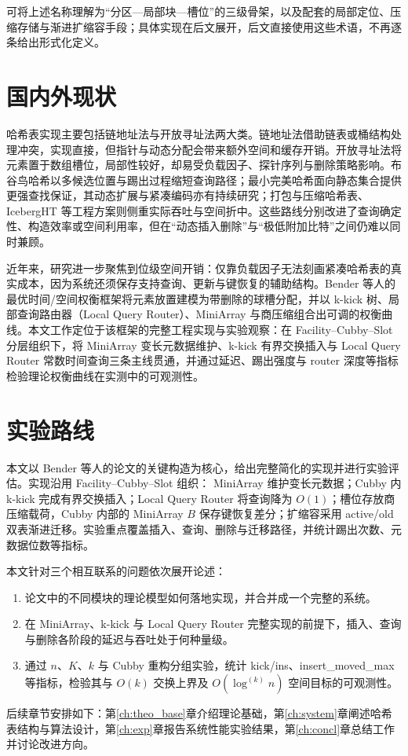 可将上述名称理解为“分区—局部块—槽位”的三级骨架，以及配套的局部定位、压缩存储与渐进扩缩容手段；具体实现在后文展开，后文直接使用这些术语，不再逐条给出形式化定义。

\section{国内外现状}

哈希表实现主要包括链地址法与开放寻址法两大类\cite{knuth1973sorting,bender2024sosa}。链地址法借助链表或桶结构处理冲突，实现直接，但指针与动态分配会带来额外空间和缓存开销。开放寻址法将元素置于数组槽位，局部性较好，却易受负载因子、探针序列与删除策略影响。布谷鸟哈希\cite{pagh2004cuckoo,lehmann2023sichash}以多候选位置与踢出过程缩短查询路径；最小完美哈希\cite{lehmann2026mphsurvey,lehmann2024shockhash,hermann2024phobic}面向静态集合提供更强查找保证，其动态扩展与紧凑编码亦有持续研究\cite{kuszmaul2024filters,lehmann2025combined}；打包与压缩哈希表\cite{kurpicz2023pachash}、IcebergHT\cite{pandey2023iceberght,bender2024iceberg} 等工程方案则侧重实际吞吐与空间折中。这些路线分别改进了查询确定性、构造效率或空间利用率，但在“动态插入删除”与“极低附加比特”之间仍难以同时兼顾。

近年来，研究进一步聚焦到位级空间开销：仅靠负载因子无法刻画紧凑哈希表的真实成本，因为系统还须保存支持查询、更新与键恢复的辅助结构。Bender 等人的最优时间/空间权衡框架\cite{bender2022otsh}将元素放置建模为带删除的球槽分配\cite{aamand2021dynamic,bansal2022deletions}，并以 k-kick 树、局部查询路由器（Local Query Router）、MiniArray 与商压缩组合出可调的权衡曲线。本文工作定位于该框架的完整工程实现与实验观察：在 Facility--Cubby--Slot 分层组织下，将 MiniArray 变长元数据维护、k-kick 有界交换插入与 Local Query Router 常数时间查询三条主线贯通，并通过延迟、踢出强度与 router 深度等指标检验理论权衡曲线在实测中的可观测性\cite{bender2022otsh,kuszmaul2024filters}。

\section{实验路线}

本文以 Bender 等人的论文\cite{bender2022otsh}的关键构造为核心，给出完整简化的实现并进行实验评估。实现沿用 Facility--Cubby--Slot 组织： MiniArray 维护变长元数据；Cubby 内 k-kick 完成有界交换插入；Local Query Router 将查询降为 \(O(1)\)；槽位存放商压缩载荷，Cubby 内部的 MiniArray \(B\) 保存键恢复差分；扩缩容采用 active/old 双表渐进迁移。实验重点覆盖插入、查询、删除与迁移路径，并统计踢出次数、元数据位数等指标。

本文针对三个相互联系的问题依次展开论述：
\begin{enumerate}
  \item 论文中的不同模块的理论模型如何落地实现，并合并成一个完整的系统。
  \item 在 MiniArray、k-kick 与 Local Query Router 完整实现的前提下，插入、查询与删除各阶段的延迟与吞吐处于何种量级。
  \item 通过 \(n\)、\(K\)、\(k\) 与 Cubby 重构分组实验，统计 kick/ins、insert\_moved\_max 等指标，检验其与 \(O(k)\) 交换上界及 \(O(\log^{(k)}n)\) 空间目标的可观测性。
\end{enumerate}

后续章节安排如下：第\ref{ch:theo_base}章介绍理论基础，第\ref{ch:system}章阐述哈希表结构与算法设计，第\ref{ch:exp}章报告系统性能实验结果，第\ref{ch:concl}章总结工作并讨论改进方向。
